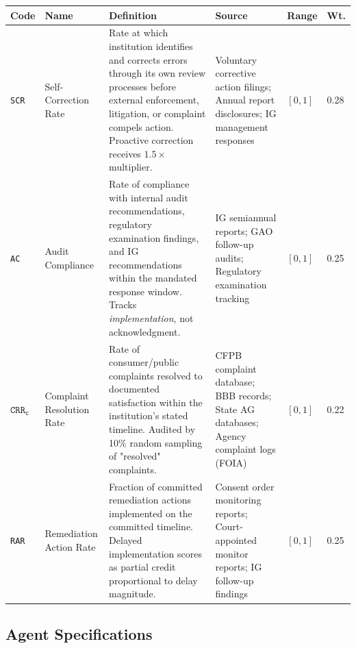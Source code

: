 \documentclass[a4paper,11pt]{article}
\begin{document}
	\begin{longtable}{L{1.1cm} L{1.9cm} L{4.5cm} L{3.5cm} C{1.1cm} C{1.1cm}}
		\toprule
		\color{white}\textbf{\sffamily Code} & \color{white}\textbf{\sffamily Name} & \color{white}\textbf{\sffamily Definition} & \color{white}\textbf{\sffamily Source} & \color{white}\textbf{\sffamily Range} & \color{white}\textbf{\sffamily Wt.} \\
		\midrule
		\endhead
		\texttt{SCR} & Self-Correction Rate & Rate at which institution identifies and corrects errors through its own review processes before external enforcement, litigation, or complaint compels action. Proactive correction receives $1.5\times$ multiplier. & Voluntary corrective action filings; Annual report disclosures; IG management responses & $[0,1]$ & 0.28 \\
		\midrule
		\texttt{AC} & Audit Compliance & Rate of compliance with internal audit recommendations, regulatory examination findings, and IG recommendations within the mandated response window. Tracks \emph{implementation}, not acknowledgment. & IG semiannual reports; GAO follow-up audits; Regulatory examination tracking & $[0,1]$ & 0.25 \\
		\midrule
		$\texttt{CRR}_{\texttt{c}}$ & Complaint Resolution Rate & Rate of consumer/public complaints resolved to documented satisfaction within the institution's stated timeline. Audited by 10\% random sampling of "resolved" complaints. & CFPB complaint database; BBB records; State AG databases; Agency complaint logs (FOIA) & $[0,1]$ & 0.22 \\
		\midrule
		\texttt{RAR} & Remediation Action Rate & Fraction of committed remediation actions implemented on the committed timeline. Delayed implementation scores as partial credit proportional to delay magnitude. & Consent order monitoring reports; Court-appointed monitor reports; IG follow-up findings & $[0,1]$ & 0.25 \\
		\bottomrule
	\end{longtable}
	
	\subsection{Agent Specifications}
	
\end{document}
